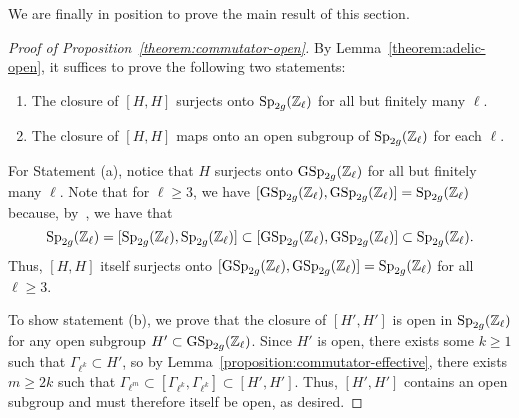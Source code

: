 We are finally in position to prove the main result of this section.
\begin{proof}[Proof of Proposition~\ref{theorem:commutator-open}]
By Lemma~\ref{theorem:adelic-open}, it suffices to prove the following two statements:
\begin{enumerate}
\item The closure of $[H,H]$ surjects onto $\operatorname{Sp}_{2g}({\mathbb Z}_\ell)$ for all but finitely many $\ell$.
\item The closure of $[H,H]$ maps onto an open subgroup of $\operatorname{Sp}_{2g}({\mathbb Z}_\ell)$ for each $\ell$.
\end{enumerate}
For Statement (a), notice that $H$ surjects onto $\operatorname{GSp}_{2g}({\mathbb Z}_\ell)$ for all but finitely many $\ell$.  Note that for $\ell \geq 3$, we have $[\operatorname{GSp}_{2g}({\mathbb Z}_\ell), \operatorname{GSp}_{2g}({\mathbb Z}_\ell)] = \operatorname{Sp}_{2g}({\mathbb Z}_\ell)$ because, by~\cite[Proposition 3]{landesman-swaminathan-tao-xu:lifting-symplectic-group}, we have that
$$\operatorname{Sp}_{2g}(\mathbb Z_\ell) = [\operatorname{Sp}_{2g}(\mathbb Z_\ell), \operatorname{Sp}_{2g}(\mathbb Z_\ell)] \subset [\operatorname{GSp}_{2g}({\mathbb Z}_\ell), \operatorname{GSp}_{2g}({\mathbb Z}_\ell)] \subset \operatorname{Sp}_{2g}({\mathbb Z}_\ell).$$
Thus, $[H,H]$ itself surjects onto $[\operatorname{GSp}_{2g}({\mathbb Z}_\ell), \operatorname{GSp}_{2g}({\mathbb Z}_\ell)] = \operatorname{Sp}_{2g}({\mathbb Z}_\ell)$ for all $\ell \geq 3$.
		
To show statement (b), we prove that the closure of $[H', H']$ is open in $\operatorname{Sp}_{2g}({\mathbb Z}_\ell)$ for any open subgroup $H' \subset \operatorname{GSp}_{2g}({\mathbb Z}_\ell)$. Since $H'$ is open, there exists some $k \geq 1$ such that $\Gamma_{\ell^k} \subset H'$, so by Lemma~\ref{proposition:commutator-effective}, there exists $m \geq 2k$ such that $\Gamma_{\ell^m} \subset [\Gamma_{\ell^k}, \Gamma_{\ell^k}] \subset [H', H']$. Thus, $[H', H']$ contains an open subgroup and must therefore itself be open, as desired.
\end{proof}
